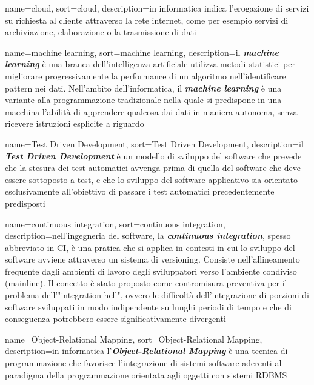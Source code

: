 {
    name=cloud,
    sort=cloud,
    description={in informatica indica l’erogazione di servizi su richiesta al cliente attraverso la rete internet, come per esempio servizi di archiviazione, elaborazione o la trasmissione di dati}
}

{
    name=machine learning,
    sort=machine learning,
    description={il \textit{\textbf{machine learning}} è una branca dell'intelligenza artificiale utilizza metodi statistici per migliorare progressivamente la performance di un algoritmo nell'identificare pattern nei dati. Nell'ambito dell'informatica, il \textit{\textbf{machine learning}} è una variante alla programmazione tradizionale nella quale si predispone in una macchina l'abilità di apprendere qualcosa dai dati in maniera autonoma, senza ricevere istruzioni esplicite a riguardo}
}

{
    name=Test Driven Development,
    sort=Test Driven Development,
    description={il \textit{\textbf{Test Driven Development}} è un modello di sviluppo del software che prevede che la stesura dei test automatici avvenga prima di quella del software che deve essere sottoposto a test, e che lo sviluppo del software applicativo sia orientato esclusivamente all'obiettivo di passare i test automatici precedentemente predisposti}
}

{
    name=continuous integration,
    sort=continuous integration,
    description={nell'ingegneria del software, la \textit{\textbf{continuous integration}}, spesso abbreviato in CI, è una pratica che si applica in contesti in cui lo sviluppo del software avviene attraverso un sistema di versioning. Consiste nell'allineamento frequente dagli ambienti di lavoro degli sviluppatori verso l'ambiente condiviso (mainline). Il concetto è stato proposto come contromisura preventiva per il problema dell'"integration hell", ovvero le difficoltà dell'integrazione di porzioni di software sviluppati in modo indipendente su lunghi periodi di tempo e che di conseguenza potrebbero essere significativamente divergenti}
}

{
    name=Object-Relational Mapping,
    sort=Object-Relational Mapping,
    description={in informatica l'\textit{\textbf{Object-Relational Mapping}} è una tecnica di programmazione che favorisce l'integrazione di sistemi software aderenti al paradigma della programmazione orientata agli oggetti con sistemi RDBMS}
}

